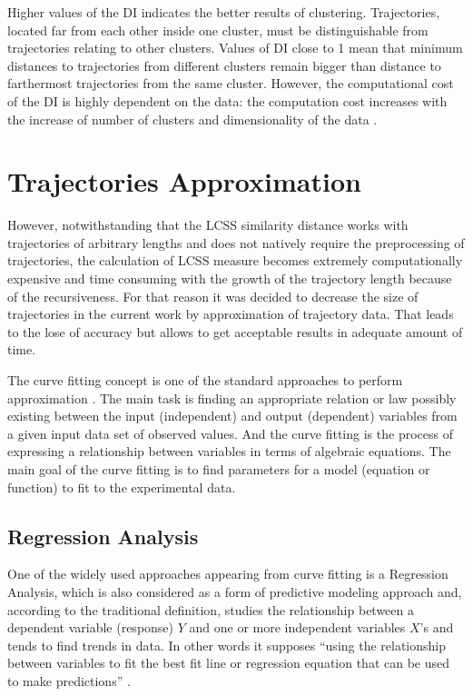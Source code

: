 Higher values of the DI indicates the better results of clustering. Trajectories, located far from each other inside one cluster, must be distinguishable from trajectories relating to other clusters. Values of DI close to 1 mean that minimum distances to trajectories from different clusters remain bigger than distance to farthermost trajectories from the same cluster. However, the computational cost of the DI is highly dependent on the data: the computation cost increases with the increase of number of clusters and dimensionality of the data \cite{online:dunn_cl_valid}.


\section{Trajectories Approximation}

However, notwithstanding that the LCSS similarity distance works with trajectories of arbitrary lengths and does not natively require the preprocessing of trajectories, the calculation of LCSS measure becomes extremely computationally expensive and time consuming with the growth of the trajectory length because of the recursiveness. For that reason it was decided to decrease the size of trajectories in the current work by approximation of trajectory data. That leads to the lose of accuracy but allows to get acceptable results in adequate amount of time.

The curve fitting concept is one of the standard approaches to perform approximation \cite{article:behav_form_extr}. The main task is finding an appropriate relation or law possibly existing between the input (independent) and output (dependent) variables from a given input data set of observed values. And the curve fitting is the process of expressing a relationship between variables in terms of algebraic equations. The main goal of the curve fitting is to find parameters for a model (equation or function) to fit to the experimental data. 

\subsection{Regression Analysis}

One of the widely used approaches appearing from curve fitting is a Regression Analysis, which is also considered as a form of predictive modeling approach and, according to the traditional definition, studies the relationship between a dependent variable (response) $Y$ and one or more independent variables $X$'s and tends to find trends in data. In other words it supposes ``using the relationship between variables to fit the best fit line or regression equation that can be used to make predictions'' \cite{online:intro_lr_pr}.

